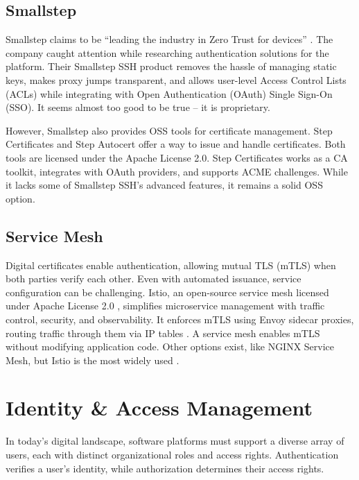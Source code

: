 \subsection{Smallstep}
Smallstep claims to be ``leading the industry in Zero Trust for devices'' \parencite{smallstep}. The company caught attention while researching authentication solutions for the platform. Their Smallstep SSH product removes the hassle of managing static keys, makes proxy jumps transparent, and allows user-level Access Control Lists (ACLs) while integrating with Open Authentication (OAuth) Single Sign-On (SSO). It seems almost too good to be true -- it is proprietary.

However, Smallstep also provides OSS tools for certificate management. Step Certificates \Parencite{smallstep_certificates} and Step Autocert \Parencite{smallstep_autocert} offer a way to issue and handle certificates. Both tools are licensed under the Apache License 2.0. Step Certificates works as a CA toolkit, integrates with OAuth providers, and supports ACME challenges. While it lacks some of Smallstep SSH's advanced features, it remains a solid OSS option.

\subsection{Service Mesh}
Digital certificates enable authentication, allowing mutual TLS (mTLS) when both parties verify each other. Even with automated issuance, service configuration can be challenging. Istio, an open-source service mesh licensed under Apache License 2.0 \Parencite{istio_license}, simplifies microservice management with traffic control, security, and observability. It enforces mTLS using Envoy sidecar proxies, routing traffic through them via IP tables \Parencite{istio_architecture}. A service mesh enables mTLS without modifying application code. Other options exist, like NGINX Service Mesh, but Istio is the most widely used \Parencite{toptal_service_mesh}.

\section{Identity \& Access Management}\label{chap:IAM}
In today's digital landscape, software platforms must support a diverse array of users, each with distinct organizational roles and access rights. Authentication verifies a user's identity, while authorization determines their access rights.

